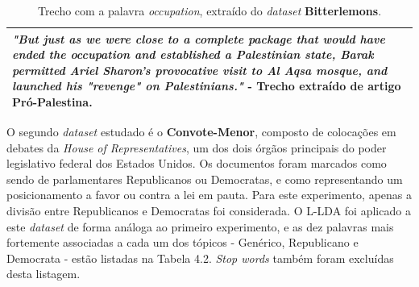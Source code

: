 \begin{table}[t]
\centering
\begin{tabular}{| p{10cm} | }
\hline
\emph{"But just as we were close to a complete
package that would have ended the \textbf{occupation} and established a
Palestinian state, Barak permitted Ariel Sharon's provocative visit to
Al Aqsa mosque, and launched his "revenge" on Palestinians."} - Trecho extraído de artigo Pró-Palestina. \\ \hline
\end{tabular}
\label{5}
\caption{Trecho com a palavra \emph{occupation}, extraído do \emph{dataset} \textbf{Bitterlemons}.}
\end{table}



O segundo \emph{dataset} estudado é o \textbf{Convote-Menor}, composto de colocações em debates da \emph{House of Representatives}, um dos dois órgãos principais do poder legislativo federal dos Estados Unidos. Os documentos foram marcados como sendo de parlamentares Republicanos ou Democratas, e como representando um posicionamento a favor ou contra a lei em pauta. Para este experimento, apenas a divisão entre Republicanos e Democratas foi considerada. O L-LDA foi aplicado a este \emph{dataset} de forma análoga ao primeiro experimento, e as dez palavras mais fortemente associadas a cada um dos tópicos - Genérico, Republicano e Democrata - estão listadas na Tabela 4.2. \emph{Stop words} também foram excluídas desta listagem.

